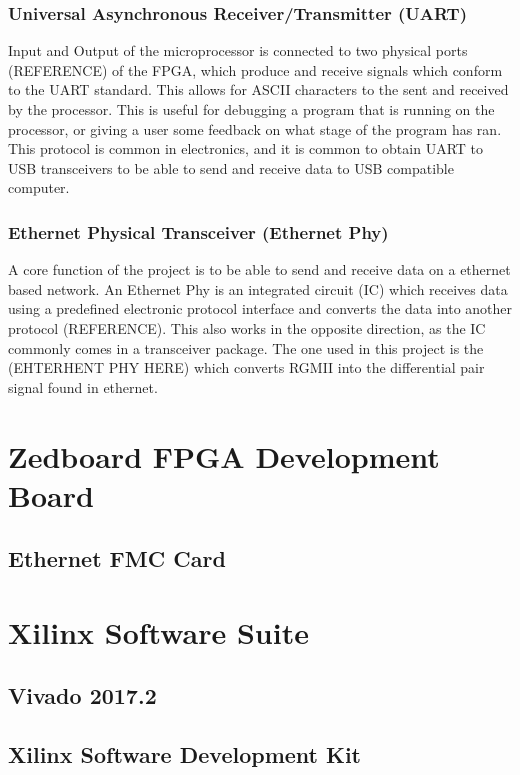 \subsubsection{Universal Asynchronous Receiver/Transmitter (UART)}

\par Input and Output of the microprocessor is connected to two physical ports (REFERENCE) of the FPGA, which produce and 
receive signals which conform to the UART standard. This allows for ASCII characters to the sent and received by 
the processor. This is useful for debugging a program that is running on the processor, or giving a user some 
feedback on what stage of the program has ran. This protocol is common in electronics, and it is common to obtain 
UART to USB transceivers to be able to send and receive data to USB compatible computer.

\subsubsection{Ethernet Physical Transceiver (Ethernet Phy)}

\par A core function of the project is to be able to send and receive data on a ethernet based network. An Ethernet 
Phy is an integrated circuit (IC) which receives data using a predefined electronic protocol interface and converts 
the data into another protocol (REFERENCE). This also works in the opposite direction, as the IC commonly comes in a transceiver 
package. The one used in this project is the (EHTERHENT PHY HERE) which converts RGMII into the differential pair signal 
found in ethernet. 

\section{Zedboard FPGA Development Board}
\subsection{Ethernet FMC Card}
\section{Xilinx Software Suite}
\subsection{Vivado 2017.2}
\subsection{Xilinx Software Development Kit}
